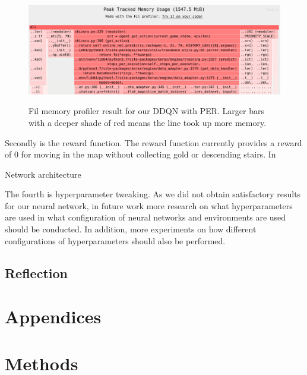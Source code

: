 \documentclass[12pt,a4paper]{article}
\begin{document}
    \begin{figure}[h]
        \caption[Fil Profiler result for DDQN with PER.]{Fil memory profiler result for our DDQN with PER. Larger bars with a deeper shade of red means the line took up more memory.}
        \centering
        \includegraphics[scale=0.3]{fil}
        \label{fig:fil}
    \end{figure}

    Secondly is the reward function.
    The reward function currently provides a reward of 0 for moving in the map without collecting gold or descending stairs.
    In

    Network architecture

    The fourth is hyperparameter tweaking.
    As we did not obtain satisfactory results for our neural network, in future work more research on what hyperparameters
    are used in what configuration of neural networks and environments are used should be conducted.
    In addition, more experiments on how different configurations of hyperparameters should also be performed.

    \subsection{Reflection}\label{subsec:reflection}



    \medskip

    
    

    \medskip

    \appendix
    \section*{Appendices}
    \section{Methods}\label{sec:methods}
\end{document}
